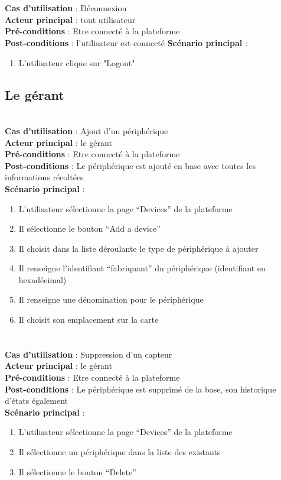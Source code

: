 \paragraph{}
~\\
\textbf{Cas d’utilisation} : Déconnexion\\
\textbf{Acteur principal} :   tout utilisateur\\
\textbf{Pré-conditions} : Etre connecté à la plateforme\\
\textbf{Post-conditions} :   l’utilisateur est connecté
\textbf{Scénario principal} :
\begin{enumerate}
 \item L’utilisateur clique sur "Logout"
\end{enumerate}


\subsection{Le gérant}
~\\
\textbf{Cas d’utilisation} : Ajout d’un périphérique\\
\textbf{Acteur principal} : le gérant\\
\textbf{Pré-conditions} : Etre connecté à la plateforme\\
\textbf{Post-conditions} : Le périphérique est ajouté en base avec toutes les informations récoltées\\
\textbf{Scénario principal} :
\begin{enumerate}
 \item L’utilisateur sélectionne la page “Devices” de la plateforme
 \item Il sélectionne le bouton “Add a device”
 \item Il choisit dans la liste déroulante le type de périphérique à ajouter
 \item Il renseigne l’identifiant “fabriquant” du périphérique (identifiant en hexadécimal)
 \item Il renseigne une dénomination pour le périphérique
 \item Il choisit son emplacement sur la carte
\end{enumerate}

\paragraph{}
~\\
\textbf{Cas d’utilisation} : Suppression d’un capteur\\
\textbf{Acteur principal} : le gérant\\
\textbf{Pré-conditions} : Etre connecté à la plateforme\\
\textbf{Post-conditions} : Le périphérique est supprimé de la base, son historique d’états également\\
\textbf{Scénario principal} :
\begin{enumerate}
 \item L’utilisateur sélectionne la page “Devices” de la plateforme
 \item Il sélectionne un périphérique dans la liste des existants
 \item Il sélectionne le bouton “Delete”
\end{enumerate}

